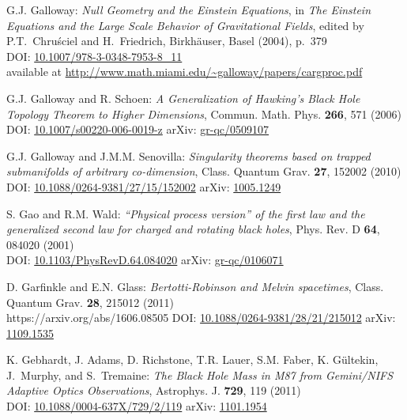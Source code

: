 \begin{thebibliography}{123}
G.J. Galloway:
{\em Null Geometry and the Einstein Equations},
in {\em The Einstein Equations and the Large Scale Behavior of Gravitational Fields},
edited by P.T.~Chruściel and H.~Friedrich,
Birkhäuser, Basel (2004), p.~379\\
DOI: \href{https://doi.org/10.1007/978-3-0348-7953-8_11}{10.1007/978-3-0348-7953-8\_11}\\
available at
{\small \url{http://www.math.miami.edu/~galloway/papers/cargproc.pdf}}

G.J. Galloway and R. Schoen:
{\em A Generalization of Hawking’s Black Hole Topology Theorem to Higher Dimensions},
Commun. Math. Phys. {\bf 266}, 571 (2006)\\
DOI: \href{https://doi.org/10.1007/s00220-006-0019-z}{10.1007/s00220-006-0019-z}\hfill
arXiv: \href{https://arxiv.org/abs/gr-qc/0509107}{gr-qc/0509107}

G.J. Galloway and  J.M.M. Senovilla:
{\em Singularity theorems based on trapped submanifolds of arbitrary co-dimension},
Class. Quantum Grav. {\bf 27}, 152002 (2010)\\
DOI: \href{https://doi.org/10.1088/0264-9381/27/15/152002}{10.1088/0264-9381/27/15/152002}\hfill
arXiv: \href{https://arxiv.org/abs/1005.1249}{1005.1249}

S. Gao and R.M. Wald:
{\em ``Physical process version'' of the first law and the generalized second law for charged and rotating black holes},
Phys. Rev. D {\bf 64}, 084020 (2001)\\
DOI: \href{https://doi.org/10.1103/PhysRevD.64.084020}{10.1103/PhysRevD.64.084020}\hfill
arXiv: \href{https://arxiv.org/abs/gr-qc/0106071}{gr-qc/0106071}

D. Garfinkle and E.N. Glass:
{\em Bertotti-Robinson and Melvin spacetimes},
Class. Quantum Grav. {\bf 28}, 215012 (2011)\\https://arxiv.org/abs/1606.08505
DOI: \href{https://doi.org/10.1088/0264-9381/28/21/215012}{10.1088/0264-9381/28/21/215012}\hfill
arXiv: \href{https://arxiv.org/abs/1109.1535}{1109.1535}

K. Gebhardt, J. Adams, D. Richstone, T.R. Lauer, S.M. Faber, K. Gültekin, J.~Murphy, and S.~Tremaine:
{\em The Black Hole Mass in M87 from Gemini/NIFS Adaptive Optics Observations},
Astrophys. J. {\bf 729}, 119 (2011)\\
DOI: \href{https://doi.org/10.1088/0004-637X/729/2/119}{10.1088/0004-637X/729/2/119}\hfill
arXiv: \href{https://arxiv.org/abs/1101.1954}{1101.1954}


\end{thebibliography}

